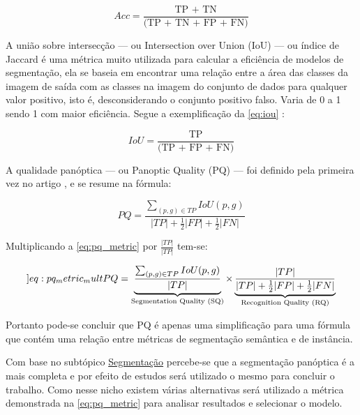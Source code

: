 \begin{equation}
	\label{eq:acc}
	Acc = \frac{\text{TP + TN}}{\text{(TP + TN + FP + FN)}}
\end{equation}


A união sobre intersecção — ou Intersection over Union (IoU) — ou índice de Jaccard é uma métrica muito utilizada para calcular a eficiência de modelos de segmentação, ela se baseia em encontrar uma relação entre a área das classes da imagem de saída com as classes na imagem do conjunto de dados para qualquer valor positivo, isto é, desconsiderando o conjunto positivo falso. Varia de 0 a 1 sendo 1 com maior eficiência. Segue a exemplificação da \cref{eq:iou} \space\cite{iou_metric_link}:

\begin{equation}
	\label{eq:iou}
	IoU = \frac{\text{TP}}{\text{(TP + FP + FN)}}
\end{equation}


A qualidade panóptica — ou Panoptic Quality (PQ) — foi definido pela primeira vez no artigo , e se resume na fórmula:

\begin{equation}
\label{eq:pq_metric}
PQ = \frac{\sum_{(p,g)\in TP}IoU(p,g)}{ |TP| + \frac{1}{2}|FP| + \frac{1}{2}|FN|}
\end{equation}

Multiplicando a \cref{eq:pq_metric} por $\frac{|TP|}{|TP|}$ tem-se:

\begin{equation}
	\label[]{eq:pq_metric_mult}
	PQ = \underbrace{\frac{\sum_{(p,g)\in TP}IoU(p,g)}{|TP|}}_{\text{Segmentation Quality (SQ)}}
	\times
	\underbrace{\frac{|TP|}{|TP| + \frac{1}{2}|FP| + \frac{1}{2}|FN|}}_{\text{Recognition Quality (RQ)}}
\end{equation}

Portanto pode-se concluir que PQ é apenas uma simplificação para uma fórmula que contém uma relação entre métricas de segmentação semântica e de instância.

Com base no subtópico \hyperref[sec:segmentacao]{Segmentação} percebe-se que a segmentação panóptica é a mais completa e por efeito de estudos será utilizado o mesmo para concluir o trabalho. Como nesse nicho existem várias alternativas será utilizado a métrica demonstrada na \cref{eq:pq_metric} para analisar resultados e selecionar o modelo.

